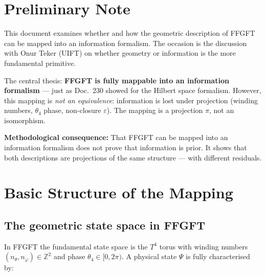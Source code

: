 
\section*{Preliminary Note}

This document examines whether and how the geometric description of FFGFT
can be mapped into an information formalism. The occasion is the discussion
with Onur Teker (UIFT) on whether geometry or information is the more
fundamental primitive.

The central thesis: \textbf{FFGFT is fully mappable into an information
formalism} --- just as Doc.~230 showed for the Hilbert space formalism.
However, this mapping is \emph{not an equivalence}: information is lost
under projection (winding numbers, $\theta_4$ phase, non-closure $\varepsilon$).
The mapping is a projection $\pi$, not an isomorphism.

\textbf{Methodological consequence:} That FFGFT can be mapped into an
information formalism does not prove that information is prior. It shows
that both descriptions are projections of the same structure --- with
different residuals.

\section{Basic Structure of the Mapping}

\subsection{The geometric state space in FFGFT}

In FFGFT the fundamental state space is the $T^4$ torus with winding
numbers $(n_\theta, n_\varphi) \in \mathbb{Z}^2$ and phase
$\theta_4 \in [0, 2\pi)$. A physical state $\Psi$ is fully
characterised by:

